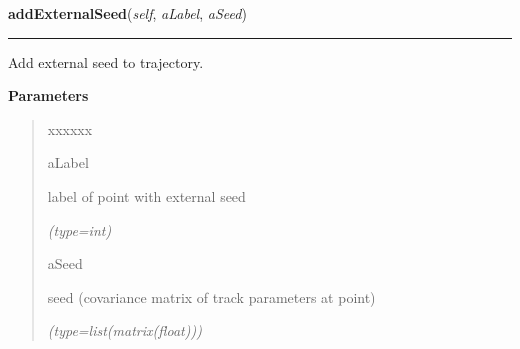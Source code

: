 \hspace{.8\funcindent}\begin{boxedminipage}{\funcwidth}

    \raggedright \textbf{addExternalSeed}(\textit{self}, \textit{aLabel}, \textit{aSeed})

    \vspace{-1.5ex}

    \rule{\textwidth}{0.5\fboxrule}
\setlength{\parskip}{2ex}
    Add external seed to trajectory.

\setlength{\parskip}{1ex}
      \textbf{Parameters}
      \vspace{-1ex}

      \begin{quote}
        \begin{Ventry}{xxxxxx}

          \item[aLabel]

          label of point with external seed

            {\it (type=int)}

          \item[aSeed]

          seed (covariance matrix of track parameters at point)

            {\it (type=list(matrix(float)))}

        \end{Ventry}

      \end{quote}

    \end{boxedminipage}

    \label{gblfit:GblTrajectory:queryJacobians}

    \vspace{0.5ex}

